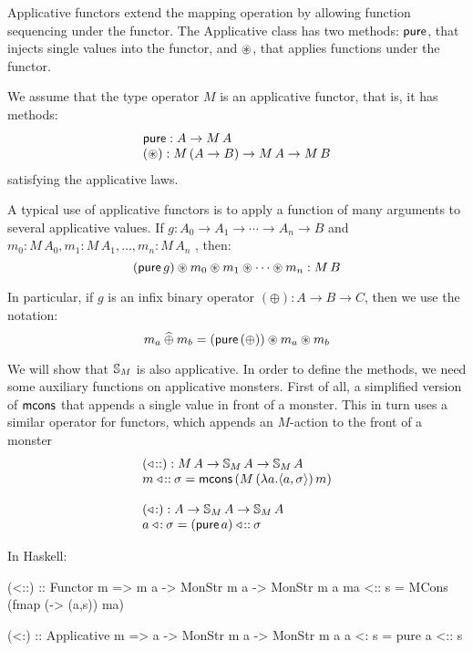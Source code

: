Applicative functors \cite{mcbride/paterson:2008}
extend the mapping operation by allowing function sequencing under the functor.
The Applicative class has two methods: $\mathsf{pure}$, that injects single values into the functor, and $\circledast$, that applies functions under the functor.

We assume that the type operator $M$ is an applicative functor, that is, it has methods:
$$
\begin{array}{l}
\mathsf{pure} : A \rightarrow M\,A\\
(\circledast): M\,(A\rightarrow B) \rightarrow M\,A \rightarrow M\,B
\end{array}
$$
satisfying the applicative laws.

A typical use of applicative functors is to apply a function of many arguments to several applicative values.
If $g:A_0\rightarrow A_1 \rightarrow \cdots \rightarrow A_n \rightarrow B$ and $m_0:M\,A_0, m_1:M\,A_1, \ldots, m_n:M\,A_n$ , then:
$$
(\mathsf{pure}\,g) \circledast m_0 \circledast m_1 \circledast \cdots \circledast m_n : M\,B
$$

In particular, if $g$ is an infix binary operator $(\oplus) : A \rightarrow B \rightarrow C$, then we use the notation:
$$
m_a \mathbin{\widehat{\oplus}} m_b = (\mathsf{pure}\,(\oplus)) \circledast m_a \circledast m_b
$$

We will show that $\mathbb{S}_{M}$ is also applicative.
In order to define the methods, we need some auxiliary functions on applicative monsters.
First of all, a simplified version of $\mathsf{mcons}$ that appends a single value in front of a monster.
This in turn uses a similar operator for functors, which appends an $M$-action to the front of a monster
$$
\begin{array}{l}
(\mathbin{\triangleleft\!::}): M\,A \rightarrow \mathbb{S}_{M}\,A \rightarrow \mathbb{S}_{M}\,A\\
m \mathbin{\triangleleft\!::} \sigma = \mathsf{mcons}\, (M\,(\lambda a. \langle a, \sigma\rangle)\,m)\\
\,\\
(\mathbin{\triangleleft\!:}): A \rightarrow \mathbb{S}_{M}\,A \rightarrow \mathbb{S}_{M}\,A\\
a \mathbin{\triangleleft\!:} \sigma = (\mathsf{pure}\, a) \mathbin{\triangleleft\!::} \sigma
\end{array}
$$

In Haskell:
\begin{haskell}
(<::) :: Functor m => m a -> MonStr m a -> MonStr m a
ma <:: s = MCons (fmap (\a -> (a,s)) ma)

(<:) :: Applicative m => a -> MonStr m a -> MonStr m a
a <: s = pure a <:: s
\end{haskell}

